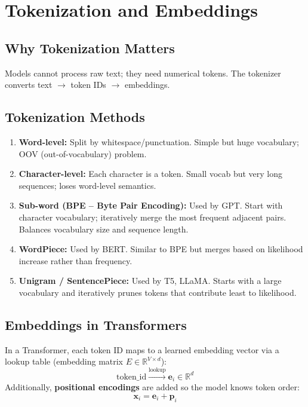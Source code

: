 \documentclass[11pt,a4paper]{article}
\begin{document}
\section{Tokenization and Embeddings}

\subsection{Why Tokenization Matters}
Models cannot process raw text; they need numerical tokens. The tokenizer converts text $\rightarrow$ token IDs $\rightarrow$ embeddings.

\subsection{Tokenization Methods}

\begin{keybox}
\begin{enumerate}[nosep]
  \item \textbf{Word-level:} Split by whitespace/punctuation. Simple but huge vocabulary; OOV (out-of-vocabulary) problem.
  \item \textbf{Character-level:} Each character is a token. Small vocab but very long sequences; loses word-level semantics.
  \item \textbf{Sub-word (BPE -- Byte Pair Encoding):} Used by GPT. Start with character vocabulary; iteratively merge the most frequent adjacent pairs. Balances vocabulary size and sequence length.
  \item \textbf{WordPiece:} Used by BERT. Similar to BPE but merges based on likelihood increase rather than frequency.
  \item \textbf{Unigram / SentencePiece:} Used by T5, LLaMA. Starts with a large vocabulary and iteratively prunes tokens that contribute least to likelihood.
\end{enumerate}
\end{keybox}

\subsection{Embeddings in Transformers}
In a Transformer, each token ID maps to a learned embedding vector via a lookup table (embedding matrix $E \in \mathbb{R}^{V \times d}$):
\[
  \text{token\_id} \xrightarrow{\text{lookup}} \mathbf{e}_i \in \mathbb{R}^d
\]
Additionally, \textbf{positional encodings} are added so the model knows token order:
\[
  \mathbf{x}_i = \mathbf{e}_i + \mathbf{p}_i
\]
\end{document}
